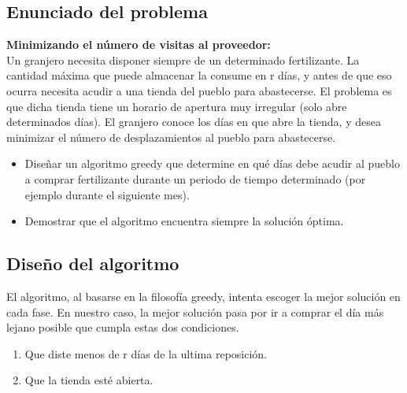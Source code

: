 \subsection{Enunciado del problema}
\textbf{Minimizando el número de visitas al proveedor:}\\

Un granjero necesita disponer siempre de un determinado fertilizante. La cantidad máxima que puede almacenar la consume en r días, y antes de que eso ocurra necesita acudir a una tienda del pueblo para abastecerse. El problema es que dicha tienda tiene un horario de apertura muy irregular (solo abre determinados días). El granjero conoce los días en que abre la tienda, y desea minimizar el número de desplazamientos al pueblo para abastecerse.\\

\begin{itemize}
\item Diseñar un algoritmo greedy que determine en qué días debe acudir al pueblo a comprar fertilizante durante un periodo de tiempo determinado (por ejemplo durante el siguiente mes).\\
\item Demostrar que el algoritmo encuentra siempre la solución  óptima.\\
\end{itemize}


\subsection{Diseño del algoritmo}

El algoritmo, al basarse en la filosofía greedy, intenta escoger la mejor solución en cada fase. En nuestro caso, la mejor solución pasa por ir a comprar el día más lejano posible que cumpla estas dos condiciones.\\
\begin{enumerate}
\item Que diste menos de r días de la ultima reposición.\\
\item Que la tienda esté abierta.\\
\end{enumerate}

